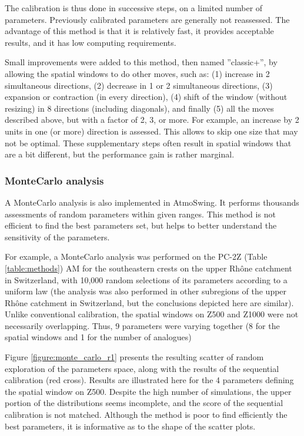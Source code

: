 \documentclass[review]{elsarticle}
\begin{document}
The calibration is thus done in successive steps, on a limited number of parameters. Previously calibrated parameters are generally not reassessed. The advantage of this method is that it is relatively fast, it provides acceptable results, and it has low computing requirements. 

Small improvements were added to this method, then named ''classic+'', by allowing the spatial windows to do other moves, such as: (1) increase in 2 simultaneous directions, (2) decrease in 1 or 2 simultaneous directions, (3) expansion or contraction (in every direction), (4) shift of the window (without resizing) in 8 directions (including diagonals), and finally (5) all the moves described above, but with a factor of 2, 3, or more. For example, an increase by 2 units in one (or more) direction is assessed. This allows to skip one size that may not be optimal. These supplementary steps often result in spatial windows that are a bit different, but the performance gain is rather marginal.

\subsubsection{Monte\textendash Carlo analysis}

A Monte\textendash Carlo analysis is also implemented in AtmoSwing. It performs thousands assessments of random parameters within given ranges. This method is not efficient to find the best parameters set, but helps to better understand the sensitivity of the parameters.

For example, a Monte\textendash Carlo analysis was performed on the PC-2Z (Table \ref{table:methods}) AM for the southeastern crests on the upper Rh\^{o}ne catchment in Switzerland, with 10,000 random selections of its parameters according to a uniform law (the analysis was also performed in other subregions of the upper Rh\^{o}ne catchment in Switzerland, but the conclusions depicted here are similar). Unlike conventional calibration, the spatial windows on Z500 and Z1000 were not necessarily overlapping. Thus, 9 parameters were varying together (8 for the spatial windows and 1 for the number of analogues)

Figure \ref{figure:monte_carlo_r1} presents the resulting scatter of random exploration of the parameters space, along with the results of the sequential calibration (red cross). Results are illustrated here for the 4 parameters defining the spatial window on Z500. Despite the high number of simulations, the upper portion of the distributions seems incomplete, and the score of the sequential calibration is not matched. Although the method is poor to find efficiently the best parameters, it is informative as to the shape of the scatter plots.
\end{document}
